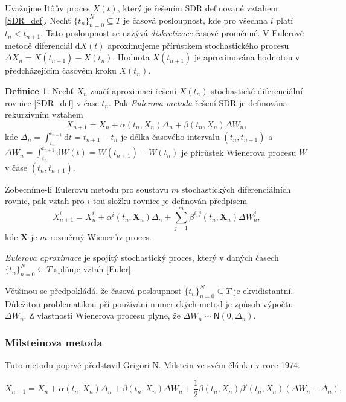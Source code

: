 \documentclass[a4paper,12pt]{report}
\theoremstyle{definition} \newtheorem{definice}[veta]{Definice}
\theoremstyle{remark}
\begin{document}
Uvažujme It\^oův proces $X(t)$, který je řešením SDR definované vztahem \eqref{SDR_def}.
Nechť $\{t_n\}_{n=0}^N\subseteq T$ je časová posloupnost, kde pro všechna $i$ platí $t_n<t_{n+1}$.
Tato  posloupnost se nazývá \textit{diskretizace} časové proměnné.
V Eulerově metodě diferenciál $\mathrm{d}X(t)$ aproximujeme přírůstkem stochastického procesu $\Delta X_n=X(t_{n+1})-X(t_n)$.
Hodnota $X(t_{n+1})$ je aproximována hodnotou v předcházejícím časovém kroku $X(t_{n})$.
\begin{definice}\label{Euler_def}
Nechť $X_n$ značí aproximaci řešení $X(t_{n})$ stochastické diferenciální rovnice \eqref{SDR_def} v čase $t_n$.
Pak \textit{Eulerova metoda} řešení SDR je definována rekurzívním vztahem
\begin{equation}\label{Euler}
X_{n+1}=X_n+\alpha(t_n,X_n)\Delta_n+\beta(t_n,X_n)\Delta W_n,
\end{equation}
kde $\Delta_n=\int_{t_n}^{t_{n+1}}\mathrm{d}t=t_{n+1}-t_n$ je délka časového intervalu $(t_n,t_{n+1})$
a $\Delta W_n=\int_{t_n}^{t_{n+1}}\mathrm{d}W(t)=W(t_{n+1})-W(t_n)$ je přírůstek Wienerova procesu $W$ v čase $(t_n,t_{n+1})$.

Zobecníme-li Eulerovu metodu pro soustavu $m$ stochastických diferenciálních rovnic, pak vztah pro $i$-tou složku rovnice je definován předpisem
\begin{equation}
X_{n+1}^i=X_n^i+\alpha^i(t_n,\boldsymbol{X}_n)\Delta_n+\sum_{j=1}^m\beta^{i,j}(t_n,\boldsymbol{X}_n)\Delta W_n^j,
\end{equation}
kde $\boldsymbol{X}$ je $m$-rozměrný Wienerův proces.
\end{definice}

\textit{Eulerova aproximace} je spojitý stochastický proces, který v daných časech $\{t_n\}_{n=0}^N\subseteq T$ splňuje vztah \eqref{Euler}.

Většinou se předpokládá, že časová posloupnost $\{t_n\}_{n=0}^N\subseteq T$ je ekvidistantní. 
Důležitou problematikou při používání numerických metod je způsob výpočtu $\Delta W_n$.
Z vlastnosti Wienerova procesu plyne, že $\Delta W_n\sim\mathsf{N}(0, \Delta_n)$.

\subsubsection{Milsteinova metoda}
Tuto metodu poprvé představil Grigori N. Milstein ve svém článku \cite{milstein1974approximate} v roce 1974.

\begin{equation}\label{Milstein}
X_{n+1}=X_n+\alpha(t_n,X_n)\Delta_n+\beta(t_n,X_n)\Delta W_n+\frac12\beta(t_n,X_n)\beta'(t_n,X_n)(\Delta W_n-\Delta_n),
\end{equation}
\end{document}
